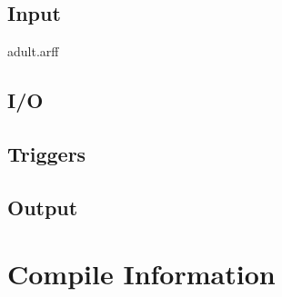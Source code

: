 \documentclass{article}
\begin{document}
    \subsection{Input}
    adult.arff

    \subsection{I/O}

    \subsection{Triggers}

    \subsection{Output}


\section{Compile Information}
\end{document}

